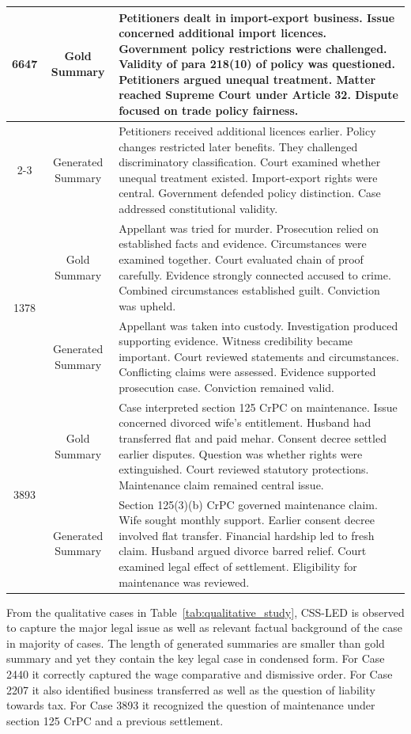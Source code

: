 \documentclass[11pt, a4paper]{article}
\theoremstyle{plain}%
\theoremstyle{remark}%
\theoremstyle{definition}%
\begin{document}
\begin{longtable}{c c p{10.5cm}}
\multirow{2}{*}{6647} & Gold Summary &
Petitioners dealt in import-export business. 
Issue concerned additional import licences. 
Government policy restrictions were challenged. 
Validity of para 218(10) of policy was questioned. 
Petitioners argued unequal treatment. 
Matter reached Supreme Court under Article 32. 
Dispute focused on trade policy fairness. \\
\cmidrule{2-3}
 & Generated Summary &
Petitioners received additional licences earlier. 
Policy changes restricted later benefits. 
They challenged discriminatory classification. 
Court examined whether unequal treatment existed. 
Import-export rights were central. 
Government defended policy distinction. 
Case addressed constitutional validity. \\
\midrule

\multirow{2}{*}{1378} & Gold Summary &
Appellant was tried for murder. 
Prosecution relied on established facts and evidence. 
Circumstances were examined together. 
Court evaluated chain of proof carefully. 
Evidence strongly connected accused to crime. 
Combined circumstances established guilt. 
Conviction was upheld. \\
\cmidrule{2-3}
 & Generated Summary &
Appellant was taken into custody. 
Investigation produced supporting evidence. 
Witness credibility became important. 
Court reviewed statements and circumstances. 
Conflicting claims were assessed. 
Evidence supported prosecution case. 
Conviction remained valid. \\
\midrule

\multirow{2}{*}{3893} & Gold Summary &
Case interpreted section 125 CrPC on maintenance. 
Issue concerned divorced wife’s entitlement. 
Husband had transferred flat and paid mehar. 
Consent decree settled earlier disputes. 
Question was whether rights were extinguished. 
Court reviewed statutory protections. 
Maintenance claim remained central issue. \\
\cmidrule{2-3}
 & Generated Summary &
Section 125(3)(b) CrPC governed maintenance claim. 
Wife sought monthly support. 
Earlier consent decree involved flat transfer. 
Financial hardship led to fresh claim. 
Husband argued divorce barred relief. 
Court examined legal effect of settlement. 
Eligibility for maintenance was reviewed. \\

\end{longtable}

From the qualitative cases in Table~\ref{tab:qualitative_study}, CSS-LED is observed to capture the major legal issue as well as relevant factual background of the case in majority of cases. The length of generated summaries are smaller than gold summary and yet they contain the key legal case in condensed form. For Case 2440 it correctly captured the wage comparative and dismissive order. For Case 2207 it also identified business transferred as well as the question of liability towards tax. For Case 3893 it recognized the question of maintenance under section 125 CrPC and a previous settlement.
\end{document}

